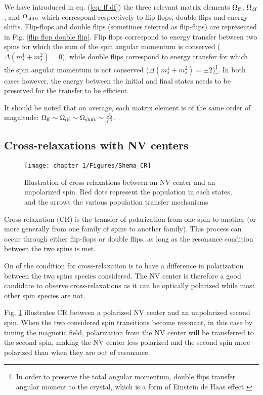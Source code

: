 \documentclass[a4paper, 11pt]{book}
\begin{document}
We have introduced in eq. (\ref{eq. ff df}) the three relevant matrix elements $\Omega_{\rm ff}$, $\Omega_{\rm df}$, and $\Omega_{\rm shift}$ which correspond respectively to flip-flops, double flips and energy shifts. Flip-flops and double flips (sometimes referred as flip-flips) are represented in Fig. \ref{flip flop double flip}. Flip flops correspond to energy transfer between two spins for which the sum of the spin angular momentum is conserved ($\Delta (m_s^1+m_s^2)=0$), while double flips correspond to energy transfer for which the spin angular momentum is not conserved ($\Delta (m_s^1+m_s^2)=\pm 2$)\footnote{In order to preserve the total angular momentum, double flips transfer angular moment to the crystal, which is a form of Einstein de Haas effect \citep{einstein1915experimental} }. In both cases however, the energy between the initial and final states needs to be preserved for the transfer to be efficient. 

It should be noted that on average, each matrix element is of the same order of magnitude: $\Omega_{\rm ff} \sim \Omega_{\rm df} \sim \Omega_{\rm shift} \sim \frac{J_0}{r^3}$. 

\subsection{Cross-relaxations with NV centers}
\label{Sec_CR}
\begin{figure}[h]
\centering
\texttt{[image: chapter 1/Figures/Shema\_CR]}
\caption{Illustration of cross-relaxations between an NV center and an unpolarized spin. Red dots represent the population in each states, and the arrows the various population transfer mechanisms}
\label{CR_shema}
\end{figure}

Cross-relaxation (CR) is the transfer of polarization from one spin to another (or more generally from one family of spins to another family). This process can occur through either flip-flops or double flips, as long as the resonance condition between the two spins is met. 

On of the condition for cross-relaxation is to have a difference in polarization between the two spins species considered. The NV center is therefore a good candidate to observe cross-relaxations as it can be optically polarized while most other spin species are not. 

Fig. \ref{CR_shema} illustrates CR between a polarized NV center and an unpolarized second spin. When the two considered spin transitions become resonant, in this case by tuning the magnetic field, polarization from the NV center will be transferred to the second spin, making the NV center less polarized and the second spin more polarized than when they are out of resonance. 
\end{document}
